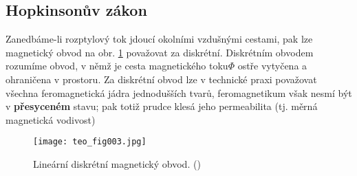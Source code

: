 {    \subsection{Hopkinsonův zákon}
      Zanedbáme-li rozptylový tok jdoucí okolními vzdušnými ces\-tami, pak lze magnetický obvod na 
      obr. \ref{teo:fig003} považovat za diskrétní. Diskrétním obvodem rozumíme obvod, v němž je 
      cesta magnetického toku\(\Phi\) ostře vytyčena a ohraničena v prostoru. Za diskrétní obvod 
      lze v technické praxi považovat všechna feromagnetická jádra jednodušších tvarů, 
      feromagnetikum však nesmí být v \textbf{přesyceném} stavu; pak totiž prudce klesá jeho 
      permeabilita (tj. měrná magnetická vodivost)
      
      \begin{figure}[ht!]  %
        \centering
        \texttt{[image: teo\_fig003.jpg]}
        \caption{Lineární diskrétní magnetický obvod.
                (\cite[s.~151]{Patocka4})}
        \label{teo:fig003}
      \end{figure}
      
}
